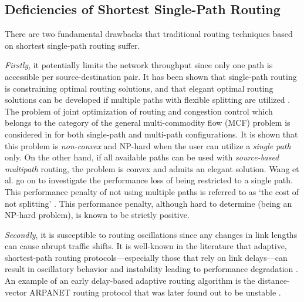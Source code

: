 \documentclass[10pt]{IEEEtran}
\begin{document}
\subsection{Deficiencies of Shortest Single-Path Routing}
\label{subsec:deficiencies}

There are two fundamental drawbacks that traditional routing techniques based on shortest single-path routing suffer.

\vspace{2mm}
\textit{Firstly}, it potentially limits the network throughput since only one path is accessible per source-destination pair. It has been shown that single-path routing is constraining optimal routing solutions, and that elegant optimal routing solutions can be developed if multiple paths with flexible splitting are utilized \cite{wang2011cost}. The problem of joint optimization of routing and congestion control which belongs to the category of the general multi-commodity flow (MCF) problem is considered in \cite{wang2009howbad} for both single-path and multi-path configurations. It is shown that this problem is \textit{non-convex} and NP-hard when the user can utilize a \textit{single path} only. On the other hand, if all available paths can be used with \textit{source-based multipath} routing, the problem is convex and admits an elegant solution. Wang et al. \cite{wang2009howbad} go on to investigate the performance loss of being restricted to a single path. This performance penalty of not using multiple paths is referred to as `the cost of not splitting' \cite{wang2011cost, wang2009howbad}. This performance penalty, although hard to determine (being an NP-hard problem), is known to be strictly positive. 

\vspace{2mm}
\textit{Secondly}, it is susceptible to routing oscillations since any changes in link lengths can cause abrupt traffic shifts. It is well-known in the literature that adaptive, shortest-path routing protocols---especially those that rely on link delays---can result in oscillatory behavior and instability leading to performance degradation \cite{wang1992analysis, bertsekas1987data}.  An example of an early delay-based adaptive routing algorithm is the distance-vector ARPANET routing protocol \cite{mcquillan1977arpa} that was later found out to be unstable \cite{mcquillan1980new, khanna1989revised}. 
\end{document}
